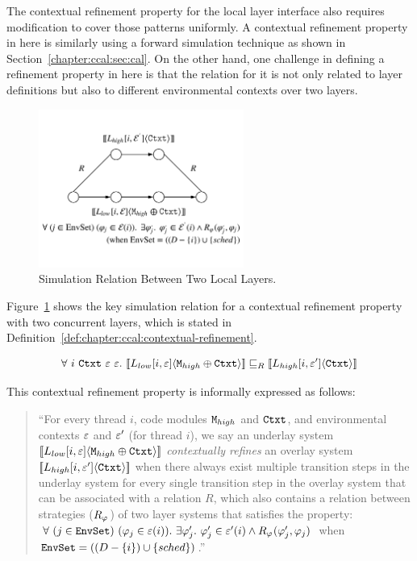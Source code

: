 The contextual refinement property for the local layer interface also requires modification to cover those patterns uniformly. 
A contextual refinement property in here is similarly using a forward simulation technique as shown in  
Section~\ref{chapter:ccal:sec:cal}.
On the other hand, one challenge in defining a refinement property in here is that the relation for it is not only related to layer definitions but also to different environmental contexts over two layers. 
\begin{figure}
\begin{center}
\includegraphics[width=0.6\textwidth]{figs/ccal/locallayerrefinement}
\end{center}
\caption{Simulation Relation Between Two Local Layers.}
\label{fig:chapter:ccal:refinement-between-two-layers}
\end{figure}
Figure~\ref{fig:chapter:ccal:refinement-between-two-layers} shows the key simulation relation for 
a contextual refinement property with two concurrent layers, which is stated  in Definition~\ref{def:chapter:ccal:contextual-refinement}.
\begin{definition}
\label{def:chapter:ccal:contextual-refinement}
$$
\forall \ i\  \codeinmath{Ctxt} \ \oracle \ \oracle .\ \sem{L_{low}[i, \oracle]}{\codeinmath{M}_{high} \oplus \codeinmath{Ctxt}} \refines_R \sem{L_{high}[i, \oracle']}{\codeinmath{Ctxt}}
$$
\end{definition}
This contextual refinement property is informally expressed as follows:
\begin{quote}
``For every thread $i$,  code modules ${\mathrm{\texttt{M}}}_{high}$ and  ${\mathrm{\texttt{Ctxt}}}$,  and environmental contexts
  ${\varepsilon}$ and ${\varepsilon}'$ (for thread $i$), we say an underlay system   $[\![{L_{low}[i, {\varepsilon}]} \langle {{\mathrm{\texttt{M}}}_{high} \oplus {\mathrm{\texttt{Ctxt}}}} \rangle]\!]$
     \textit{contextually
 refines} an overlay system $ [\![{L_{high}[i, {\varepsilon}']} \langle {{\mathrm{\texttt{Ctxt}}}} \rangle]\!]$ when there always exist 
 multiple  transition steps in the underlay system for every  single  transition step
  in the overlay system that can be associated with a relation $R$,
which also contains a relation between strategies ($R_{\varphi_{}}$)
 of two layer systems that satisfies the property:
$\forall\ (j \in \codeinmath{EnvSet})\ 
(\strat{j} \in \oracle(i)) .\ \exists \stratp{j} . \ \stratp{j} \in \oracle'(i) \wedge R_{\strat{}}(\stratp{j}, \strat{j})$ when 
${\mathrm{\texttt{EnvSet}}} = ((D - \{ i\}) \cup \{ sched\})$.''
\end{quote}

